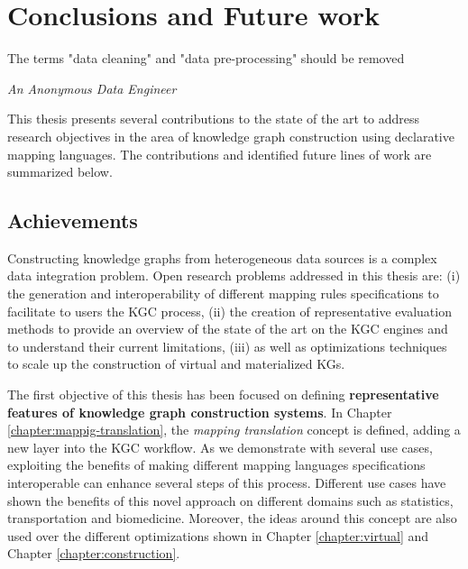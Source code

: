 \chapter{Conclusions and Future work}
\label{chap:conc}

\epigraph{The terms "data cleaning" and "data pre-processing" should be removed}{\textit{An Anonymous Data Engineer}}

This thesis presents several contributions to the state of the art to address research objectives in the area of knowledge graph construction using declarative mapping languages. The contributions and identified future lines of work are summarized below.


\section{Achievements}
Constructing knowledge graphs from heterogeneous data sources is a complex data integration problem. Open research problems addressed in this thesis are: (i) the generation and interoperability of different mapping rules specifications to facilitate to users the KGC process, (ii) the creation of representative evaluation methods to provide an overview of the state of the art on the KGC engines and to understand their current limitations, (iii) as well as optimizations techniques to scale up the construction of virtual and materialized KGs. 
 
 
The first objective of this thesis has been focused on defining \textbf{representative features of knowledge graph construction systems}. In Chapter \ref{chapter:mappig-translation}, the \textit{mapping translation} concept is defined, adding a new layer into the KGC workflow. As we demonstrate with several use cases, exploiting the benefits of making different mapping languages specifications interoperable can enhance several steps of this process. Different use cases have shown the benefits of this novel approach on different domains such as statistics, transportation and biomedicine. Moreover, the ideas around this concept are also used over the different optimizations shown in Chapter \ref{chapter:virtual} and Chapter \ref{chapter:construction}.

